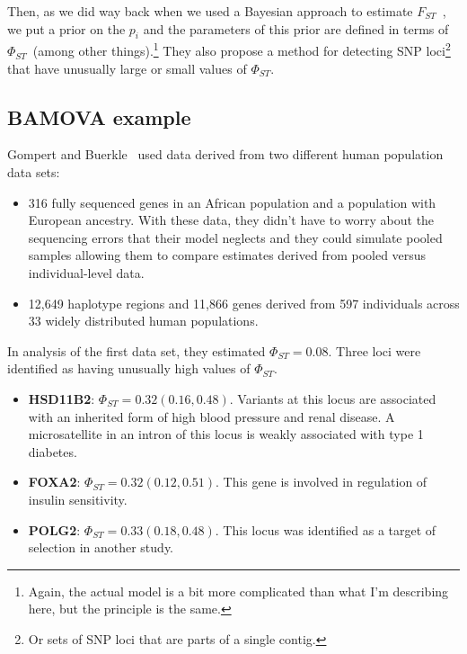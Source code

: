 \documentclass[12pt]{article}
\begin{document}
Then, as we did way back when we used a Bayesian approach to estimate
$F_{ST}$~\cite{Holsinger-Wallace-2004}, we put a prior on the $p_i$
and the parameters of this prior are defined in terms of
$\Phi_{ST}$~(among other things).\footnote{Again, the actual model is
  a bit more complicated than what I'm describing here, but the
  principle is the same.} They also propose a method for detecting SNP
loci\footnote{Or sets of SNP loci that are parts of a single contig.}
that have unusually large or small values of $\Phi_{ST}$.

\subsection*{BAMOVA example}

Gompert and Buerkle~\cite{Gompert-Buerkle-2011} used data derived from
two different human population data sets:

\begin{itemize}

\item 316 fully sequenced genes in an African population and a
  population with European ancestry. With these data, they didn't have
  to worry about the sequencing errors that their model neglects and
  they could simulate pooled samples allowing them to compare
  estimates derived from pooled versus individual-level data.

\item 12,649 haplotype regions and 11,866 genes derived from 597
  individuals across 33 widely distributed human populations.

\end{itemize}

In analysis of the first data set, they estimated
$\Phi_{ST}=0.08$. Three loci were identified as having unusually high
values of $\Phi_{ST}$. 

\begin{itemize}

\item {\bf HSD11B2}: $\Phi_{ST}=0.32 (0.16,0.48)$. Variants at this
  locus are associated with an inherited form of high blood pressure
  and renal disease. A microsatellite in an intron of this locus is
  weakly associated with type 1 diabetes.

\item {\bf FOXA2}: $\Phi_{ST}=0.32 (0.12,0.51)$. This gene is involved
  in regulation of insulin sensitivity.

\item {\bf POLG2}: $\Phi_{ST}=0.33 (0.18,0.48)$. This locus was
  identified as a target of selection in another study.

\end{itemize}
\end{document}
